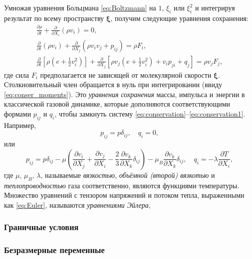 Умножая уравнения Больцмана \eqref{eq:Boltzmann} на \(1\), \(\xi_i\) или \(\xi_i^2\)
и интегрируя результат по всему пространству \(\boldsymbol\xi\), получим следующие уравнения сохранения:
\begin{gather}\label{eq:conservation}
	\frac{\partial\rho}{\partial t} + \frac{\partial}{\partial X_i}(\rho v_i) = 0, \\
	\frac{\partial}{\partial t}(\rho v_i) + \frac{\partial}{\partial X_j}(\rho v_i v_j + p_{ij}) = \rho F_i, \\
	\frac{\partial}{\partial t}\left[\rho\left(e+\frac1{2}v_i^2\right)\right] + 
		\frac{\partial}{\partial X_j}\left[\rho v_j\left(e+\frac1{2}v_i^2\right) + v_i p_{ji} + q_j\right] = \rho v_j F_j, \label{eq:conservation1}
\end{gather}
где сила \(F_i\) предполагается не зависящей от молекулярной скорости \(\boldsymbol\xi\).
Столкновительный член обращается в нуль при интегрировании (ввиду \eqref{eq:conser_moments}).
Это \textit{уравнения сохранения} массы, импульса и энергии в классической газовой динамике,
которые дополняются соответствующими формами \(p_{ij}\) и \(q_i\), чтобы замкнуть систему \eqref{eq:conservation}--\eqref{eq:conservation1}.
Например,
\begin{equation}\label{eq:Euler}
	p_{ij}=p\delta_{ij}, \quad q_i=0,
\end{equation}
или
\begin{equation}\label{eq:Navier-Stokes}
	p_{ij}=p\delta_{ij}-\mu\left(\frac{\partial v_i}{\partial X_j}+\frac{\partial v_j}{\partial X_i}-\frac2{3}\frac{\partial v_k}{\partial X_k}\delta_{ij}\right)
	- \mu_B\frac{\partial v_k}{\partial X_k}\delta_{ij}, \quad q_i=-\lambda\frac{\partial T}{\partial X_i},
\end{equation}
где \(\mu\), \(\mu_B\), \(\lambda\), называемые \textit{вязкостью}, \textit{объёмной (второй) вязкотью} и 
\textit{теплопроводностью} газа соответственно, являются функциями температуры.
Множество уравнений с тензором напряжений и потоком тепла, выраженными как \eqref{eq:Euler}, называются \textit{уравнениями Эйлера},

\subsubsection{Граничные условия}
\subsubsection{Безразмерные переменные}


